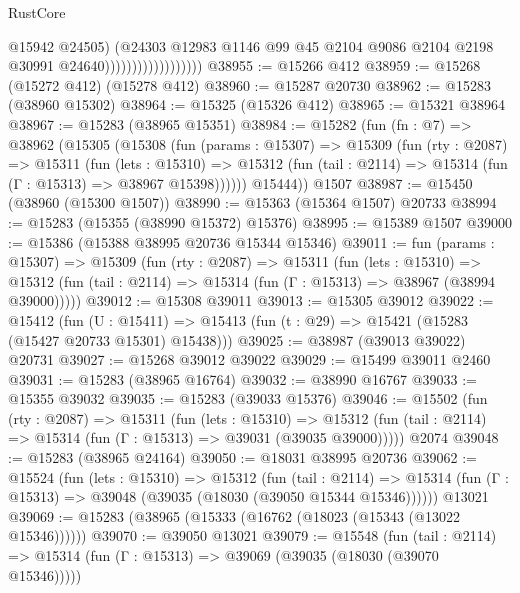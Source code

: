 \begin{lexlean}{RustCore}
\begin{coremodule}
                                        @15942
                                        @24505)
                                      (@24303
                                        @12983
                                        @1146
                                        @99
                                        @45
                                        @2104
                                        @9086
                                        @2104
                                        @2198
                                        @30991
                                        @24640))))))))))))))))))
@38955 := @15266 @412
@38959 := @15268 (@15272 @412) (@15278 @412)
@38960 := @15287 @20730
@38962 := @15283 (@38960 @15302)
@38964 := @15325 (@15326 @412)
@38965 := @15321 @38964
@38967 := @15283 (@38965 @15351)
@38984 := @15282
    (fun (fn : @7) =>
    @38962
      (@15305
        (@15308
          (fun (params : @15307) =>
          @15309
            (fun (rty : @2087) =>
            @15311
              (fun (lets : @15310) =>
              @15312 (fun (tail : @2114) => @15314 (fun (Γ : @15313) => @38967 @15398))))))
        @15444))
    @1507
@38987 := @15450 (@38960 (@15300 @1507))
@38990 := @15363 (@15364 @1507) @20733
@38994 := @15283 (@15355 (@38990 @15372) @15376)
@38995 := @15389 @1507
@39000 := @15386 (@15388 @38995 @20736 @15344 @15346)
@39011 := fun (params : @15307) =>
  @15309
    (fun (rty : @2087) =>
    @15311
      (fun (lets : @15310) =>
      @15312 (fun (tail : @2114) => @15314 (fun (Γ : @15313) => @38967 (@38994 @39000)))))
@39012 := @15308 @39011
@39013 := @15305 @39012
@39022 := @15412
    (fun (U : @15411) => @15413 (fun (t : @29) => @15421 (@15283 (@15427 @20733 @15301) @15438)))
@39025 := @38987 (@39013 @39022) @20731
@39027 := @15268 @39012 @39022
@39029 := @15499 @39011 @2460
@39031 := @15283 (@38965 @16764)
@39032 := @38990 @16767
@39033 := @15355 @39032
@39035 := @15283 (@39033 @15376)
@39046 := @15502
    (fun (rty : @2087) =>
    @15311
      (fun (lets : @15310) =>
      @15312 (fun (tail : @2114) => @15314 (fun (Γ : @15313) => @39031 (@39035 @39000)))))
    @2074
@39048 := @15283 (@38965 @24164)
@39050 := @18031 @38995 @20736
@39062 := @15524
    (fun (lets : @15310) =>
    @15312
      (fun (tail : @2114) =>
      @15314 (fun (Γ : @15313) => @39048 (@39035 (@18030 (@39050 @15344 @15346))))))
    @13021
@39069 := @15283 (@38965 (@15333 (@16762 (@18023 (@15343 (@13022 @15346))))))
@39070 := @39050 @13021
@39079 := @15548
    (fun (tail : @2114) => @15314 (fun (Γ : @15313) => @39069 (@39035 (@18030 (@39070 @15346)))))

\end{coremodule}
\end{lexlean}
